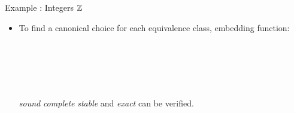\documentclass[11pt, mathserif,handout]{beamer}
\begin{document}
\begin{frame}[allowframebreaks,t]{Example : Integers $\mathbb{Z}$}
\begin{itemize}
\item To find a canonical choice for each equivalence
  class, embedding function:

\begin{code}
\\
\> \<[11]%
\>[11]\AgdaSymbol{:}   \<%
\\
\> \AgdaInductiveConstructor{+}   \<[11]%
\>[11]\AgdaSymbol{=}  \AgdaInductiveConstructor{,} \<%
\\
\>    \AgdaSymbol{=}  \AgdaInductiveConstructor{,}  \<%
\\
\end{code}


\emph{sound} \emph{complete} \emph{stable} and \emph{exact}
can be verified.

\end{itemize}

\end{frame}
\end{document}
